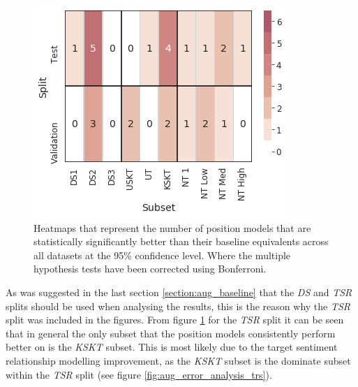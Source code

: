\begin{figure}[h!]
    \centering
    \includegraphics[scale=0.6]{images/augmentation/methods_performance/Position_Encoding/position_combined_subset_heatmap.png}
    \caption{Heatmaps that represent the number of position models that are statistically significantly better than their baseline equivalents across all datasets at the 95\% confidence level. Where the multiple hypothesis tests have been corrected using Bonferroni.}
    \label{fig:aug_position_combined_subset_heatmap}
\end{figure}

As was suggested in the last section \ref{section:aug_baseline} that the \textit{DS} and \textit{TSR} splits should be used when analysing the results, this is the reason why the \textit{TSR} split was included in the figures. From figure \ref{fig:aug_position_combined_subset_heatmap} for the \textit{TSR} split it can be seen that in general the only subset that the position models consistently perform better on is the \textit{KSKT} subset. This is most likely due to the target sentiment relationship modelling improvement, as the \textit{KSKT} subset is the dominate subset within the \textit{TSR} split (see figure \ref{fig:aug_error_analysis_trs}).

